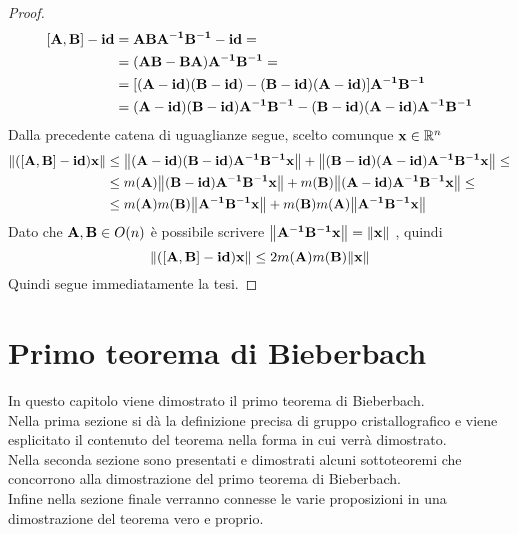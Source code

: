 \documentclass[a4paper,11pt,openright,twoside	]{book}
\begin{document}
\begin{proof}
\begin{equation*}
\begin{split}
[\vb{A,B}] - \vb{id} & = \vb{ABA^{-1}B^{-1} - id } = \\
& = \vb{(AB -BA)A^{-1}B^{-1} } = \\
& = [ \vb{ (A-id)(B-id) - (B-id)(A-id)}] \vb{A^{-1}B^{-1}} \\
& = \vb{( A-id)(B-id) A^{-1}B^{-1} -  (B-id)(A-id) A^{-1}B^{-1}}
\end{split}
\end{equation*}  
Dalla precedente catena di uguaglianze segue, scelto comunque $\vb{x} \in \mathbb{R}^n $
 \begin{equation*} 
\begin{split}
\norm{\vb{([A,B] - id )x}} & \leq \norm{\vb{ ( A-id)(B-id) A^{-1}B^{-1}x}} +  \norm{\vb{(B-id)(A-id) A^{-1}B^{-1}x}} \leq \\
& \leq m(\vb{A}) \norm{\vb{(B-id) A^{-1}B^{-1}x}} + m(\vb{B}) \norm{\vb{(A-id) A^{-1}B^{-1}x}} \leq \\ 
& \leq m(\vb{A})m(\vb{B})\norm{\vb{A^{-1}B^{-1}x}} + m(\vb{B})m(\vb{A}) \norm{\vb{A^{-1}B^{-1}x}}
\end{split}
\end{equation*}
Dato che $ \vb{A,B} \in O(n)$ è possibile scrivere $\norm{\vb{A^{-1}B^{-1}x}} = \norm{\vb{x}} $ , quindi 
\begin{equation*}
  \norm{\vb{([A,B] - id )x}}  \leq 2m(\vb{A})m(\vb{B})\norm{\vb{x}}
\end{equation*} 
Quindi segue immediatamente la tesi. 
\end{proof}

\chapter{Primo teorema di Bieberbach}
In questo capitolo viene dimostrato il primo teorema di Bieberbach. \\
Nella prima sezione si dà la definizione precisa di gruppo cristallografico e viene esplicitato il contenuto del teorema nella forma in cui verrà dimostrato. \\
Nella seconda sezione sono presentati e dimostrati alcuni sottoteoremi che concorrono alla dimostrazione del primo teorema di Bieberbach. \\ 
Infine nella sezione finale verranno connesse le varie proposizioni in una dimostrazione del teorema vero e proprio.  \\
\end{document}
